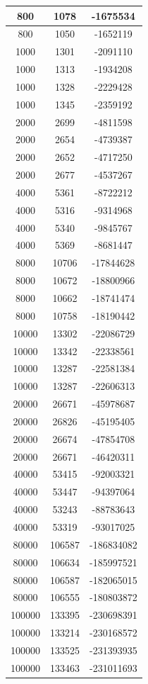 \begin{longtable}{|c|c|c|}
	800 & 1078 & -1675534 \\ \hline
	800 & 1050 & -1652119 \\ \hline
	1000 & 1301 & -2091110 \\ \hline
	1000 & 1313 & -1934208 \\ \hline
	1000 & 1328 & -2229428 \\ \hline
	1000 & 1345 & -2359192 \\ \hline
	2000 & 2699 & -4811598 \\ \hline
	2000 & 2654 & -4739387 \\ \hline
	2000 & 2652 & -4717250 \\ \hline
	2000 & 2677 & -4537267 \\ \hline
	4000 & 5361 & -8722212 \\ \hline
	4000 & 5316 & -9314968 \\ \hline
	4000 & 5340 & -9845767 \\ \hline
	4000 & 5369 & -8681447 \\ \hline
	8000 & 10706 & -17844628 \\ \hline
	8000 & 10672 & -18800966 \\ \hline
	8000 & 10662 & -18741474 \\ \hline
	8000 & 10758 & -18190442 \\ \hline
	10000 & 13302 & -22086729 \\ \hline
	10000 & 13342 & -22338561 \\ \hline
	10000 & 13287 & -22581384 \\ \hline
	10000 & 13287 & -22606313 \\ \hline
	20000 & 26671 & -45978687 \\ \hline
	20000 & 26826 & -45195405 \\ \hline
	20000 & 26674 & -47854708 \\ \hline
	20000 & 26671 & -46420311 \\ \hline
	40000 & 53415 & -92003321 \\ \hline
	40000 & 53447 & -94397064 \\ \hline
	40000 & 53243 & -88783643 \\ \hline
	40000 & 53319 & -93017025 \\ \hline
	80000 & 106587 & -186834082 \\ \hline
	80000 & 106634 & -185997521 \\ \hline
	80000 & 106587 & -182065015 \\ \hline
	80000 & 106555 & -180803872 \\ \hline
	100000 & 133395 & -230698391 \\ \hline
	100000 & 133214 & -230168572 \\ \hline
	100000 & 133525 & -231393935 \\ \hline
	100000 & 133463 & -231011693 \\ \hline
	
\end{longtable}

